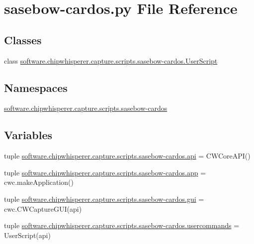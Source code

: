 \hypertarget{sasebow-cardos_8py}{}\section{sasebow-\/cardos.py File Reference}
\label{sasebow-cardos_8py}
\subsection*{Classes}
\begin{DoxyCompactItemize}
\item 
class \hyperlink{classsoftware_1_1chipwhisperer_1_1capture_1_1scripts_1_1sasebow-cardos_1_1UserScript}{software.\+chipwhisperer.\+capture.\+scripts.\+sasebow-\/cardos.\+User\+Script}
\end{DoxyCompactItemize}
\subsection*{Namespaces}
\begin{DoxyCompactItemize}
\item 
 \hyperlink{namespacesoftware_1_1chipwhisperer_1_1capture_1_1scripts_1_1sasebow-cardos}{software.\+chipwhisperer.\+capture.\+scripts.\+sasebow-\/cardos}
\end{DoxyCompactItemize}
\subsection*{Variables}
\begin{DoxyCompactItemize}
\item 
tuple \hyperlink{namespacesoftware_1_1chipwhisperer_1_1capture_1_1scripts_1_1sasebow-cardos_aa83e497babd56b17be786ef1d9a05fca}{software.\+chipwhisperer.\+capture.\+scripts.\+sasebow-\/cardos.\+api} = C\+W\+Core\+A\+P\+I()
\item 
tuple \hyperlink{namespacesoftware_1_1chipwhisperer_1_1capture_1_1scripts_1_1sasebow-cardos_ab596c8b99b8bda5858ba831ed7d39e09}{software.\+chipwhisperer.\+capture.\+scripts.\+sasebow-\/cardos.\+app} = cwc.\+make\+Application()
\item 
tuple \hyperlink{namespacesoftware_1_1chipwhisperer_1_1capture_1_1scripts_1_1sasebow-cardos_a3b7b8daf0eda683e72bbfe2464cb9e58}{software.\+chipwhisperer.\+capture.\+scripts.\+sasebow-\/cardos.\+gui} = cwc.\+C\+W\+Capture\+G\+U\+I(api)
\item 
tuple \hyperlink{namespacesoftware_1_1chipwhisperer_1_1capture_1_1scripts_1_1sasebow-cardos_ac01cc554263744b669eca645e3409d58}{software.\+chipwhisperer.\+capture.\+scripts.\+sasebow-\/cardos.\+usercommands} = User\+Script(api)
\end{DoxyCompactItemize}
